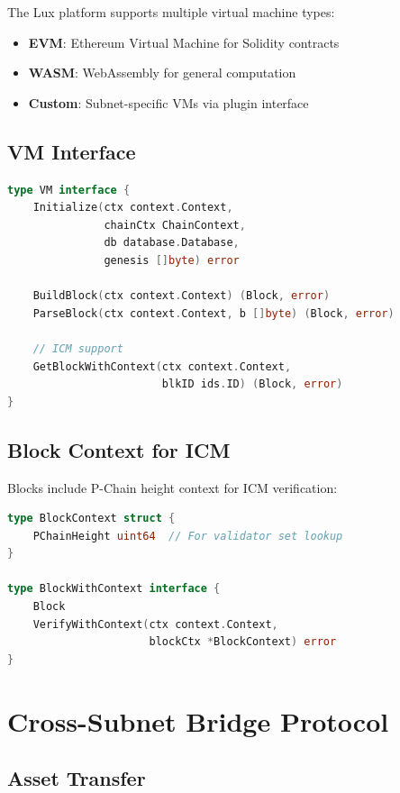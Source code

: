 \documentclass[11pt,a4paper]{article}
\begin{document}
The Lux platform supports multiple virtual machine types:

\begin{itemize}
    \item \textbf{EVM}: Ethereum Virtual Machine for Solidity contracts
    \item \textbf{WASM}: WebAssembly for general computation
    \item \textbf{Custom}: Subnet-specific VMs via plugin interface
\end{itemize}

\subsection{VM Interface}

\begin{lstlisting}[language=Go,basicstyle=\small\ttfamily]
type VM interface {
    Initialize(ctx context.Context,
               chainCtx ChainContext,
               db database.Database,
               genesis []byte) error

    BuildBlock(ctx context.Context) (Block, error)
    ParseBlock(ctx context.Context, b []byte) (Block, error)

    // ICM support
    GetBlockWithContext(ctx context.Context,
                        blkID ids.ID) (Block, error)
}
\end{lstlisting}

\subsection{Block Context for ICM}

Blocks include P-Chain height context for ICM verification:

\begin{lstlisting}[language=Go,basicstyle=\small\ttfamily]
type BlockContext struct {
    PChainHeight uint64  // For validator set lookup
}

type BlockWithContext interface {
    Block
    VerifyWithContext(ctx context.Context,
                      blockCtx *BlockContext) error
}
\end{lstlisting}

\section{Cross-Subnet Bridge Protocol}

\subsection{Asset Transfer}
\end{document}
